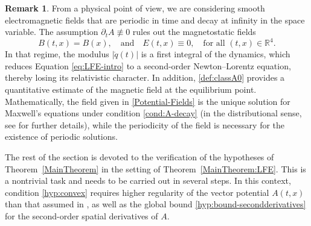 \documentclass{article}
\newcommand{\R}{\mathbb{R}}
\theoremstyle{definition}
\newtheorem{remark}{Remark}[section]
\begin{document}
	
	\begin{remark}\label{remark:magnetostatic}
		From a physical point of view, we are considering smooth electromagnetic fields that are periodic in time and decay at infinity in the space variable. The assumption $\partial_tA\not\equiv0$ rules out the magnetostatic fields
		\begin{equation}\label{def:magnetostatic}
			B(t,x)=B(x),\quad\text{and}\quad E(t,x)\equiv0,\quad\text{for all }(t,x)\in\R^4.
		\end{equation}
		In that regime, the modulus $|\dot q(t)|$ is a first integral of the dynamics, which reduces Equation \eqref{eq:LFE-intro} to a second-order Newton–Lorentz equation, thereby losing its relativistic character. In addition, \eqref{def:classA0} provides a quantitative estimate of the magnetic field at the equilibrium point.  Mathematically, the field given in \eqref{Potential-Fields} is the unique solution for Maxwell's equations under condition \eqref{cond:A-decay} (in the distributional sense, see \cite{GM,GT2} for further details), while the periodicity of the field is necessary for the existence of periodic solutions.
	\end{remark}
	
	The rest of the section is devoted to the verification of the hypotheses of Theorem~\ref{MainTheorem} in the setting of Theorem~\ref{MainTheorem:LFE}. This is a nontrivial task and needs to be carried out in several steps.  In this context, condition \eqref{hyp:convex} requires higher regularity of the vector potential $A(t,x)$ than that assumed in \cite[Theorem 2.1]{GLM}, as well as the global bound \eqref{hyp:bound-secondderivatives} for the second-order spatial derivatives of $A$.
	
\end{document}
